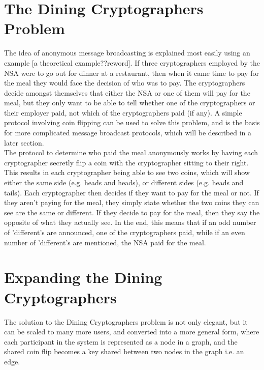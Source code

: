 \section{The Dining Cryptographers Problem}

The idea of anonymous message broadcasting is explained most easily using an
example [a theoretical example??reword].  If three cryptographers employed by
the NSA were to go out for dinner at a restaurant, then when it came time to
pay for the meal they would face the decision of who was to pay.  The
cryptographers decide amongst themselves that either the NSA or one of them
will pay for the meal, but they only want to be able to tell whether one of the
cryptographers or their employer paid, not which of the cryptographers paid (if
any).  A simple protocol involving coin flipping can be used to solve this
problem, and is the basis for more complicated message broadcast protocols,
which will be described in a later section. \\

The protocol to determine who paid the meal anonymously works by having each
cryptographer secretly flip a coin with the cryptographer sitting to their right.  This
results in each cryptographer being able to see two coins, which will show
either the same side (e.g. heads and heads), or different sides (e.g. heads and
tails).  Each cryptographer then decides if they want to pay for the meal or
not.  If they aren't paying for the meal, they simply state whether the two
coins they can see are the same or different.  If they decide to pay for the
meal, then they say the opposite of what they actually see.  In the end, this
means that if an odd number of 'different's are announced, one of the
cryptographers paid, while if an even number of 'different's are mentioned, the
NSA paid for the meal. \\

\section{Expanding the Dining Cryptographers}

The solution to the Dining Cryptographers problem is not only elegant, but it
can be scaled to many more users, and converted into a more general form, where
each participant in the system is represented as a node in a graph, and the
shared coin flip becomes a key shared between two nodes in the graph i.e. an
edge.
